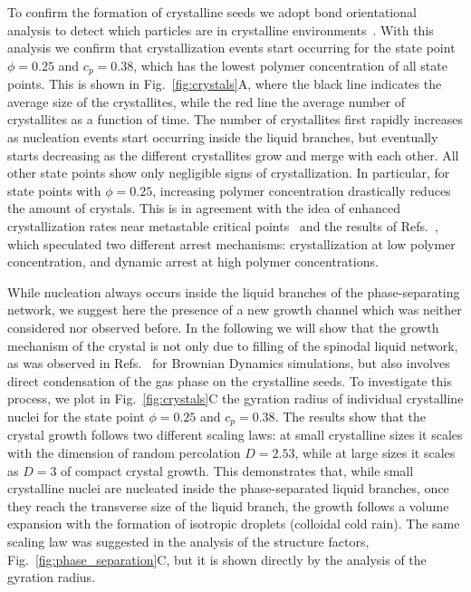\documentclass[12pt]{article}
\begin{document}
To confirm the formation of crystalline seeds we adopt bond orientational analysis to detect which particles are in crystalline environments~\cite{russo2012microscopic}. With this analysis we confirm that crystallization events start occurring for the state point $\phi=0.25$ and $c_p=0.38$, which has the lowest
polymer concentration of all state points. This is shown in Fig.~\ref{fig:crystals}A, where the black line indicates the average size of the crystallites,
while the red line the average number of crystallites as a function of time. The number of crystallites first rapidly increases as nucleation events
start occurring inside the liquid branches, but eventually starts decreasing as the different crystallites grow and merge with each other.
All other state points show only negligible signs of crystallization. In particular, for state points with $\phi=0.25$, increasing
polymer concentration drastically reduces the amount of crystals. This is in agreement with the
idea of enhanced crystallization rates near metastable critical points~\cite{ten1997enhancement,olmsted1998spinodal} and the
results of Refs.~\cite{fortini2008crystallization,perez2011pathways},
which speculated two different arrest mechanisms: crystallization at low polymer concentration, and dynamic arrest at high polymer concentrations.

While nucleation always occurs inside the liquid branches of the phase-separating network, we suggest here the presence of a new growth channel
which was neither considered nor observed before. In the following we will show that the growth mechanism of the crystal is not only due to filling of the spinodal liquid network, as was observed in Refs.~\cite{fortini2008crystallization,perez2011pathways} for Brownian Dynamics simulations, but also involves direct condensation of the gas phase
on the crystalline seeds.
To investigate this process, we plot in Fig.~\ref{fig:crystals}C the gyration radius of individual crystalline nuclei for the state point
$\phi=0.25$ and $c_p=0.38$. The results show that the crystal growth follows two different scaling laws: at small crystalline sizes it scales with
the dimension of random percolation $D=2.53$, while at large sizes it scales as $D=3$ of compact crystal growth. This demonstrates that, while
small crystalline nuclei are nucleated inside the phase-separated liquid branches, once they reach the transverse size of the liquid branch, the growth
follows a volume expansion with the formation of isotropic droplets (colloidal cold rain). The same scaling law was suggested in the analysis of the
structure factors, Fig.~\ref{fig:phase_separation}C, but it is shown directly by the analysis of the gyration radius.
\end{document}
